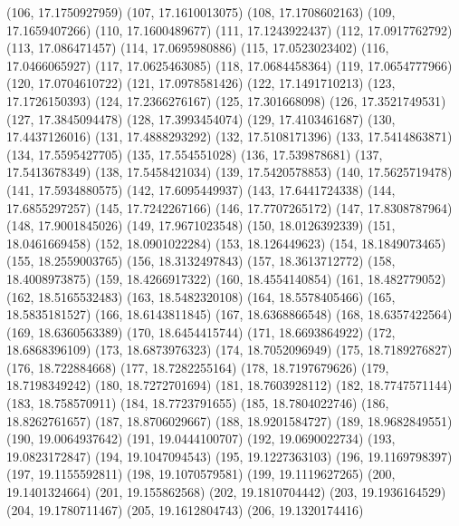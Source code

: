 {					(106, 17.1750927959)
					(107, 17.1610013075)
					(108, 17.1708602163)
					(109, 17.1659407266)
					(110, 17.1600489677)
					(111, 17.1243922437)
					(112, 17.0917762792)
					(113, 17.086471457)
					(114, 17.0695980886)
					(115, 17.0523023402)
					(116, 17.0466065927)
					(117, 17.0625463085)
					(118, 17.0684458364)
					(119, 17.0654777966)
					(120, 17.0704610722)
					(121, 17.0978581426)
					(122, 17.1491710213)
					(123, 17.1726150393)
					(124, 17.2366276167)
					(125, 17.301668098)
					(126, 17.3521749531)
					(127, 17.3845094478)
					(128, 17.3993454074)
					(129, 17.4103461687)
					(130, 17.4437126016)
					(131, 17.4888293292)
					(132, 17.5108171396)
					(133, 17.5414863871)
					(134, 17.5595427705)
					(135, 17.554551028)
					(136, 17.539878681)
					(137, 17.5413678349)
					(138, 17.5458421034)
					(139, 17.5420578853)
					(140, 17.5625719478)
					(141, 17.5934880575)
					(142, 17.6095449937)
					(143, 17.6441724338)
					(144, 17.6855297257)
					(145, 17.7242267166)
					(146, 17.7707265172)
					(147, 17.8308787964)
					(148, 17.9001845026)
					(149, 17.9671023548)
					(150, 18.0126392339)
					(151, 18.0461669458)
					(152, 18.0901022284)
					(153, 18.126449623)
					(154, 18.1849073465)
					(155, 18.2559003765)
					(156, 18.3132497843)
					(157, 18.3613712772)
					(158, 18.4008973875)
					(159, 18.4266917322)
					(160, 18.4554140854)
					(161, 18.482779052)
					(162, 18.5165532483)
					(163, 18.5482320108)
					(164, 18.5578405466)
					(165, 18.5835181527)
					(166, 18.6143811845)
					(167, 18.6368866548)
					(168, 18.6357422564)
					(169, 18.6360563389)
					(170, 18.6454415744)
					(171, 18.6693864922)
					(172, 18.6868396109)
					(173, 18.6873976323)
					(174, 18.7052096949)
					(175, 18.7189276827)
					(176, 18.722884668)
					(177, 18.7282255164)
					(178, 18.7197679626)
					(179, 18.7198349242)
					(180, 18.7272701694)
					(181, 18.7603928112)
					(182, 18.7747571144)
					(183, 18.758570911)
					(184, 18.7723791655)
					(185, 18.7804022746)
					(186, 18.8262761657)
					(187, 18.8706029667)
					(188, 18.9201584727)
					(189, 18.9682849551)
					(190, 19.0064937642)
					(191, 19.0444100707)
					(192, 19.0690022734)
					(193, 19.0823172847)
					(194, 19.1047094543)
					(195, 19.1227363103)
					(196, 19.1169798397)
					(197, 19.1155592811)
					(198, 19.1070579581)
					(199, 19.1119627265)
					(200, 19.1401324664)
					(201, 19.155862568)
					(202, 19.1810704442)
					(203, 19.1936164529)
					(204, 19.1780711467)
					(205, 19.1612804743)
					(206, 19.1320174416)
}
